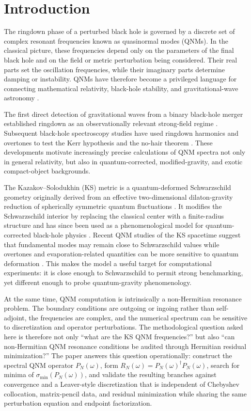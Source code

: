 ﻿\documentclass[12pt,a4paper]{article}
\begin{document}
\section{Introduction}

The ringdown phase of a perturbed black hole is governed by a discrete set of complex resonant frequencies known as quasinormal modes (QNMs). In the classical picture, these frequencies depend only on the parameters of the final black hole and on the field or metric perturbation being considered. Their real parts set the oscillation frequencies, while their imaginary parts determine damping or instability. QNMs have therefore become a privileged language for connecting mathematical relativity, black-hole stability, and gravitational-wave astronomy \cite{Kokkotas1999,Berti2009,Konoplya2011}.

The first direct detection of gravitational waves from a binary black-hole merger established ringdown as an observationally relevant strong-field regime \cite{Abbott2016Observation}. Subsequent black-hole spectroscopy studies have used ringdown harmonics and overtones to test the Kerr hypothesis and the no-hair theorem \cite{Berti2006,Isi2019}. These developments motivate increasingly precise calculations of QNM spectra not only in general relativity, but also in quantum-corrected, modified-gravity, and exotic compact-object backgrounds.

The Kazakov--Solodukhin (KS) metric is a quantum-deformed Schwarzschild geometry originally derived from an effective two-dimensional dilaton-gravity reduction of spherically symmetric quantum fluctuations \cite{Kazakov1994}. It modifies the Schwarzschild interior by replacing the classical center with a finite-radius structure and has since been used as a phenomenological model for quantum-corrected black-hole physics \cite{Berry2021,Konoplya2020,Bolokhov2025}. Recent QNM studies of the KS spacetime suggest that fundamental modes may remain close to Schwarzschild values while overtones and evaporation-related quantities can be more sensitive to quantum deformation \cite{Konoplya2020,Bolokhov2025}. This makes the model a useful target for computational experiments: it is close enough to Schwarzschild to permit strong benchmarking, yet different enough to probe quantum-gravity phenomenology.

At the same time, QNM computation is intrinsically a non-Hermitian resonance problem. The boundary conditions are outgoing or ingoing rather than self-adjoint, the frequencies are complex, and the numerical spectrum can be sensitive to discretization and operator perturbations. The methodological question asked here is therefore not only ``what are the KS QNM frequencies?'' but also ``can non-Hermitian QNM resonance conditions be audited through Hermitian residual minimization?'' The paper answers this question operationally: construct the spectral QNM operator \(P_N(\omega)\), form \(R_N(\omega)=P_N(\omega)^\dagger P_N(\omega)\), search for minima of \(\sigma_{\min}(P_N(\omega))\), and validate the resulting branches against convergence and a Leaver-style discretization that is independent of Chebyshev collocation, matrix-pencil data, and residual minimization while sharing the same perturbation equation and endpoint factorization.
\end{document}
